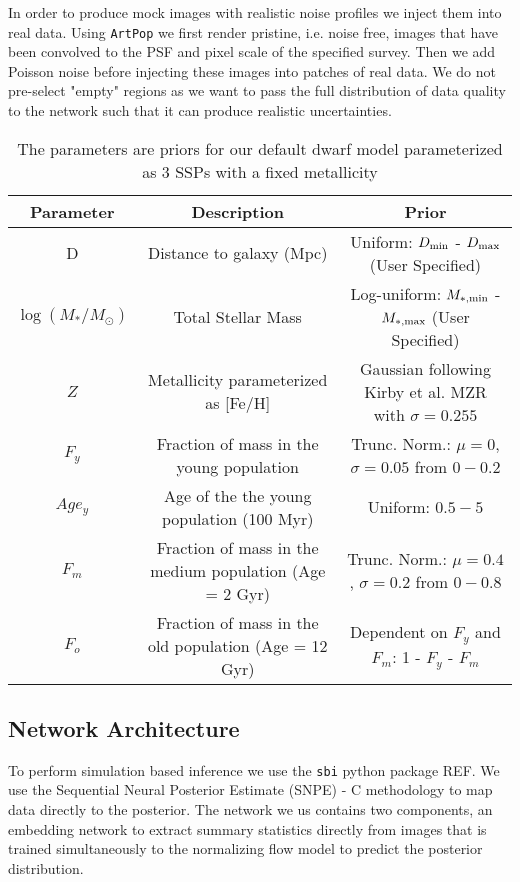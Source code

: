 \documentclass[twocolumn]{aastex631}
\newcommand{\artpop}[0]{\texttt{ArtPop}}
\newcommand{\sbi}[0]{\texttt{sbi}}
\begin{document}
In order to produce mock images with realistic noise profiles we inject them into real data. Using \artpop{} we first render pristine, i.e. noise free, images that have been convolved to the PSF and pixel scale of the specified survey. Then we add Poisson noise before injecting these images into patches of real data. We do not pre-select "empty" regions as we want to pass the full distribution of data quality to the network such that it can produce realistic uncertainties.

\begin{table*}
    \centering
    \caption{The parameters are priors for our default dwarf model parameterized as 3 SSPs with a fixed metallicity}
    \small
    \begin{tabular}{c c c} 
        Parameter & Description & Prior \\  \hline \hline
         D & Distance to galaxy (Mpc) & Uniform: $D_{\rm min}$ -  $D_{\rm max}$ (User Specified) \\
         $\log (M_*/M_\odot)$ & Total Stellar Mass & Log-uniform: $M_{\rm*, min}$ -  $M_{\rm* , max}$ (User Specified) \\
         $Z$ & Metallicity parameterized as [Fe/H] & Gaussian following Kirby et al. MZR with $\sigma = 0.255$ \\
         $F_{y}$& Fraction of mass in the young population & Trunc. Norm.: $\mu=0$, $\sigma=0.05$ from $0-0.2$\\
         $Age_{y}$& Age of the the young population (100 Myr) & Uniform: $0.5-5$\\
         $F_{m}$& Fraction of mass in the medium population (Age = 2 Gyr) & Trunc. Norm.: $\mu=0.4$, $\sigma=0.2$ from $0-0.8$\\
         $F_{o}$& Fraction of mass in the old population (Age = 12 Gyr) & Dependent on $F_{y}$ and $F_{m}$: 1 - $F_{y}$ - $F_{m}$\\ \hline  
    \end{tabular}
    \label{tab:dwarf_model}
\end{table*}

\subsection{Network Architecture}
\label{sec:NN}
To perform simulation based inference we use the \sbi{} python package {REF}. We use the Sequential Neural Posterior Estimate (SNPE) - C methodology to map data directly to the posterior. The network we us contains two components, an embedding network to extract summary statistics directly from images that is trained simultaneously to the normalizing flow model to predict the posterior distribution. 
\end{document}
